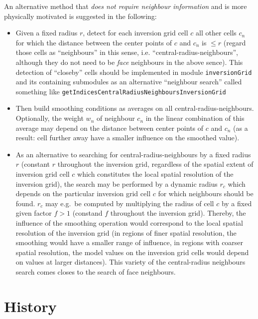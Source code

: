 \documentclass[12pt,a4paper]{article}
\newcommand{\lcode}[1]{\nolinkurl{#1}}
\begin{document}
An alternative method that \emph{does not require neighbour information} and is more physically motivated is 
suggested in the following:
\begin{itemize}
\item Given a fixed radius $r$, detect for each inversion grid cell $c$ all other cells $c_n$ for which the
  distance between the center points of $c$ and $c_n$ is $\le r$ (regard those cells as ``neighbours'' in this 
  sense, i.e. ``central-radius-neighbours'', although they do not need to be \emph{face} neighbours in the 
  above sence). This detection of ``closeby'' cells
  should be implemented in module \lcode{inversionGrid} and its containing submodules as an alternative ``neighbour search''
  called something like \lcode{getIndicesCentralRadiusNeighboursInversionGrid}
\item Then build smoothing conditions as averages on all central-radius-neighbours. Optionally, the weight $w_n$
  of neighbour $c_n$ in the linear combination of this average may depend on the distance between center points of
  $c$ and $c_n$ (as a result: cell further away have a smaller influence on the smoothed value).
\item As an alternative to searching for central-radius-neighbours by a fixed radius $r$ (constant $r$ throughout 
  the inversion grid, regardless of the spatial extent of inversion grid cell $c$ which constitutes the local 
  spatial resolution of the inversion grid), the search may be performed by a dynamic radius $r_c$ which 
  depends on the particular inversion grid cell $c$ for which neighbours should be found. $r_c$ may e.g.\ be computed
  by multiplying the radius of cell $c$ by a fixed given factor $f>1$ (constand $f$ throughout the inversion grid).
  Thereby, the influence of the smoothing operation would correspond to the local spatial resolution of the 
  inversion grid (in regions of finer spatial resolution, the smoothing would have a smaller range of influence, 
  in regions with coarser spatial resolution, the model values on the inversion grid cells would depend on values
  at larger distances). This variety of the central-radius neighbours search comes closes to the search of face
  neighbours.
\end{itemize}



%


%
\newpage
\section*{History}

%
\newpage

%
\end{document}
